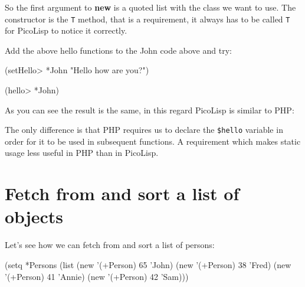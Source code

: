 So the first argument to \textbf{new} is a quoted list with the class
we want to use. The constructor is the \texttt{T} method, that is a
requirement, it always has to be called \texttt{T} for PicoLisp to
notice it correctly.

Add the above hello functions to the John code above and try:

\begin{wideverbatim}
(setHello> *John "Hello how are you?")

(hello> *John)
\end{wideverbatim}

As you can see the result is the same, in this regard PicoLisp is similar to
PHP:



The only difference is that PHP requires us to declare the
\texttt{\$hello} variable in order for it to be used in subsequent
functions. A requirement which makes static usage less useful in PHP
than in PicoLisp.

\section{Fetch from and sort a list of objects}
\label{sec:simple-oo-fetch-from-and-sort-a-list-of-objects}


Let's see how we can fetch from and sort a list of persons:

\begin{wideverbatim}
(setq *Persons (list 
               (new '(+Person) 65 'John) 
               (new '(+Person) 38 'Fred)
               (new '(+Person) 41 'Annie) 
               (new '(+Person) 42 'Sam)))
\end{wideverbatim}

